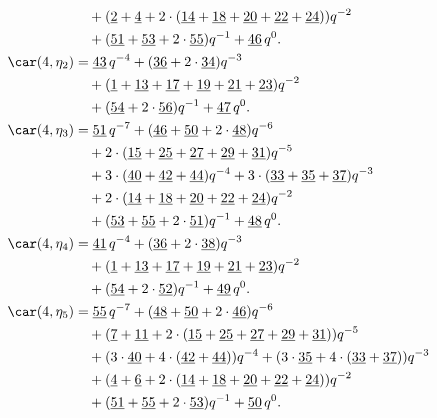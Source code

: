 \begin{align*}
	&\quad+(\underline{2}+\underline{4}+2\cdot(\underline{14}+\underline{18}+\underline{20}+\underline{22}+\underline{24}))q^{-2}\\
	&\quad+(\underline{51}+\underline{53}+2\cdot\underline{55})q^{-1}+\underline{46}\,q^0.\\
	\car(4,\eta_{2})
	&=\underline{43}\,q^{-4}+(\underline{36}+2\cdot\underline{34})q^{-3}\\
	&\quad+(\underline{1}+\underline{13}+\underline{17}+\underline{19}+\underline{21}+\underline{23})q^{-2}\\
	&\quad+(\underline{54}+2\cdot\underline{56})q^{-1}+\underline{47}\,q^0.\\
	\car(4,\eta_{3})
	&=\underline{51}\,q^{-7}+(\underline{46}+\underline{50}+2\cdot\underline{48})q^{-6}\\
	&\quad+2\cdot(\underline{15}+\underline{25}+\underline{27}+\underline{29}+\underline{31})q^{-5}\\
	&\quad+3\cdot(\underline{40}+\underline{42}+\underline{44})q^{-4}+3\cdot(\underline{33}+\underline{35}+\underline{37})q^{-3}\\
	&\quad+2\cdot(\underline{14}+\underline{18}+\underline{20}+\underline{22}+\underline{24})q^{-2}\\
	&\quad+(\underline{53}+\underline{55}+2\cdot\underline{51})q^{-1}+\underline{48}\,q^0.\\
	\car(4,\eta_{4})
	&=\underline{41}\,q^{-4}+(\underline{36}+2\cdot\underline{38})q^{-3}\\
	&\quad+(\underline{1}+\underline{13}+\underline{17}+\underline{19}+\underline{21}+\underline{23})q^{-2}\\
	&\quad+(\underline{54}+2\cdot\underline{52})q^{-1}+\underline{49}\,q^0.\\
	\car(4,\eta_{5})
	&=\underline{55}\,q^{-7}+(\underline{48}+\underline{50}+2\cdot\underline{46})q^{-6}\\
	&\quad+(\underline{7}+\underline{11}+2\cdot(\underline{15}+\underline{25}+\underline{27}+\underline{29}+\underline{31}))q^{-5}\\
	&\quad+(3\cdot\underline{40}+4\cdot(\underline{42}+\underline{44}))q^{-4}+(3\cdot\underline{35}+4\cdot(\underline{33}+\underline{37}))q^{-3}\\
	&\quad+(\underline{4}+\underline{6}+2\cdot(\underline{14}+\underline{18}+\underline{20}+\underline{22}+\underline{24}))q^{-2}\\
	&\quad+(\underline{51}+\underline{55}+2\cdot\underline{53})q^{-1}+\underline{50}\,q^0.\\

\end{align*}
